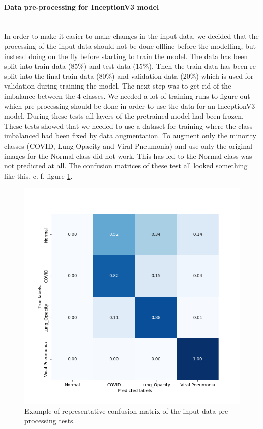 \documentclass{article}
\begin{document}
\paragraph{Data pre-processing for InceptionV3 model}\mbox{}\\
In order to make it easier to make changes in the input data, we decided that the processing of the input data should not be done offline before the modelling, but instead doing on the fly before starting to train the model. 
The data has been split into train data (85\%) and test data (15\%). Then the train data has been re-split into the final train data (80\%) and validation data (20\%) which is used for validation during training the model. 
The next step was to get rid of the imbalance between the 4 classes. We needed a lot of training runs to figure out which pre-processing should be done in order to use the data for an InceptionV3 model. During these tests all layers of the pretrained model had been frozen. 
These tests showed that we needed to use a dataset for training where the class imbalanced had been fixed by data augmentation. To augment only the minority classes (COVID, Lung Opacity and Viral Pneumonia) and use only the original images for the Normal-class did not work. This has led to the Normal-class was not predicted at all. The confusion matrices of these test all looked something like this, c. f. figure \ref{fig:vgg16_yb_03_cm_norm.png}.

\begin{figure}%
    \centering
    \includegraphics[width=0.5\linewidth]{vgg16_yb_03_cm_norm.png}
    \caption{Example of representative confusion matrix of the input data pre-processing tests.}
    \label{fig:vgg16_yb_03_cm_norm.png}
\end{figure}
\end{document}

